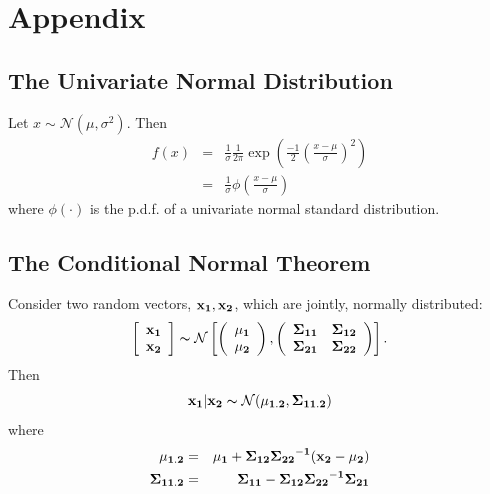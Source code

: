 \renewcommand{\thesection}{\Alph{section}}
\setcounter{section}{0}
\section{Appendix} \label{section:appendix}

\subsection{The Univariate Normal Distribution} \label{section:uninormal}
Let $x \sim \mathcal{N} \left( \mu, \sigma^2 \right)$. Then
\begin{eqnarray}
f(x) &=& \frac{1}{\sigma} \frac{1}{2\pi} \exp \left( \frac{-1}{2} \left( \frac{x - \mu}{\sigma} \right)^2 \right) \nonumber \\
     &=& \frac{1}{\sigma} \phi \left( \frac{x - \mu}{\sigma} \right) 
\end{eqnarray}
\noindent where $\phi(\cdot)$ is the p.d.f. of a univariate normal standard distribution.

\subsection{The Conditional Normal Theorem} \label{section:conditional}
Consider two random vectors, $\bf{x_{1}}, \bf{x_{2}}$, which are jointly, normally distributed:
\begin{equation}
\left[ \begin{array}{c}
\bf{x_{1}} \\
\bf{x_{2}} 
\end{array} \right]
\thicksim \mathcal{N}
\left[ \left( \begin{array}{c}
\bf{\mu_{1}} \\
\bf{\mu_{2}} 
\end{array} \right)
,
\left( \begin{array}{cc}
\bf{\Sigma_{11}} & \bf{\Sigma_{12}}  \\
\bf{\Sigma_{21}} & \bf{\Sigma_{22}}
\end{array} \right) \right]. 
\end{equation}
\noindent Then
\begin{equation}
\bf{x_{1}} | \bf{x_{2}} \thicksim \mathcal{N} (\bf{\mu_{1.2}},\bf{\Sigma_{11.2}})
\end{equation}
where
\begin{eqnarray}
\bf{\mu_{1.2}}     &=& \bf{\mu_{1}} + \bf{\Sigma_{12}}{\bf{\Sigma_{22}}}^{-1}(\bf{x_{2}}-\mu_{2}) \\
\bf{\Sigma_{11.2}} &=& \bf{\Sigma_{11}}   - \bf{\Sigma_{12}}{\bf{\Sigma_{22}}}^{-1}\bf{\Sigma_{21}}
\end{eqnarray}

